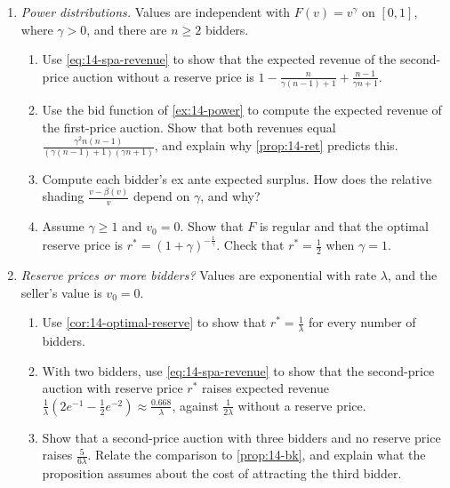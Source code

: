 \begin{enumerate}[label=\arabic*., leftmargin=*, itemsep=6pt]

\item \textit{Power distributions.} Values are independent with $F(v)=v^\gamma$ on $[0,1]$, where $\gamma>0$,
and there are $n\ge 2$ bidders.
\begin{enumerate}[label=(\alph*)]
  \item Use \eqref{eq:14-spa-revenue} to show that the expected revenue of the second-price auction without a
  reserve price is $1-\frac{n}{\gamma(n-1)+1}+\frac{n-1}{\gamma n+1}$.
  \item Use the bid function of \cref{ex:14-power} to compute the expected revenue of the first-price auction.
  Show that both revenues equal $\frac{\gamma^2n(n-1)}{(\gamma(n-1)+1)(\gamma n+1)}$, and explain why
  \cref{prop:14-ret} predicts this.
  \item Compute each bidder's ex ante expected surplus. How does the relative shading
  $\frac{v-\beta(v)}{v}$ depend on $\gamma$, and why?
  \item Assume $\gamma\ge 1$ and $v_0=0$. Show that $F$ is regular and that the optimal reserve price is
  $r^*=(1+\gamma)^{-\frac{1}{\gamma}}$. Check that $r^*=\frac{1}{2}$ when $\gamma=1$.
\end{enumerate}

\item \textit{Reserve prices or more bidders?} Values are exponential with rate $\lambda$, and the seller's
value is $v_0=0$.
\begin{enumerate}[label=(\alph*)]
  \item Use \cref{cor:14-optimal-reserve} to show that $r^*=\frac{1}{\lambda}$ for every number of bidders.
  \item With two bidders, use \eqref{eq:14-spa-revenue} to show that the second-price auction with reserve price
  $r^*$ raises expected revenue $\frac{1}{\lambda}\left(2e^{-1}-\frac{1}{2}e^{-2}\right)\approx\frac{0.668}{\lambda}$,
  against $\frac{1}{2\lambda}$ without a reserve price.
  \item Show that a second-price auction with three bidders and no reserve price raises $\frac{5}{6\lambda}$.
  Relate the comparison to \cref{prop:14-bk}, and explain what the proposition assumes about the cost of
  attracting the third bidder.
\end{enumerate}


\end{enumerate}
